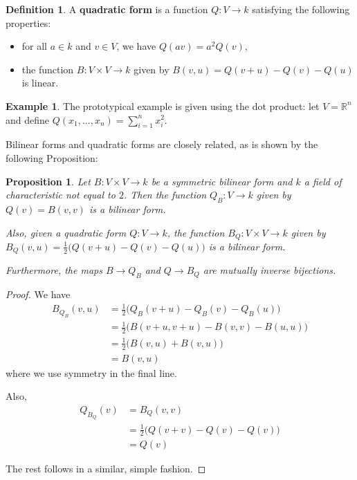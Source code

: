 \documentclass[12pt]{article}
\theoremstyle{plain}
\newtheorem{proposition}[thm]{Proposition}
\theoremstyle{definition}
\newtheorem{defn}[thm]{Definition} %
\newtheorem{example}[thm]{Example}
\newcommand{\bb}[1]{\mathbb{#1}}
\newcommand{\lto}{\longrightarrow}
\begin{document}
\begin{defn}
A \textbf{quadratic form} is a function $Q: V \lto k$ satisfying the following properties:
\begin{itemize}
    \item for all $a \in k$ and $v \in V$, we have $Q(av) = a^2Q(v)$,
    \item the function $B: V \times V \lto k$ given by $B(v,u) = Q(v + u) - Q(v) - Q(u)$ is linear.
\end{itemize}
\end{defn}
\begin{example}
The prototypical example is given using the dot product: let $V = \bb{R}^n$ and define $Q(x_1,...,x_n) = \sum_{i = 1}^n x_i^2$.
\end{example}
Bilinear forms and quadratic forms are closely related, as is shown by the following Proposition:
\begin{proposition}
Let $B: V \times V \lto k$ be a symmetric bilinear form and $k$ a field of characteristic not equal to $2$. Then the function $Q_B: V \lto k$ given by $Q(v) = B(v,v)$ is a bilinear form.

Also, given a quadratic form $Q: V \lto k$, the function $B_Q: V \times V \lto k$ given by $B_Q(v,u) = \frac{1}{2}\big(Q(v + u) - Q(v) - Q(u)\big)$ is a bilinear form.

Furthermore, the maps $B \lto Q_B$ and $Q \lto B_Q$ are mutually inverse bijections.
\end{proposition}
\begin{proof}
We have
\begin{align*}
    B_{Q_B}(v,u) &= \frac{1}{2}\big(Q_B(v + u) - Q_B(v) - Q_B(u)\big)\\
    &= \frac{1}{2}\big(B(v+u,v+u) - B(v,v) - B(u,u)\big)\\
    &= \frac{1}{2}\big(B(v,u) + B(v,u)\big)\\
    &= B(v,u)
\end{align*}
where we use symmetry in the final line.

Also,
\begin{align*}
    Q_{B_Q}(v) &= B_Q(v,v)\\
    &= \frac{1}{2}\big(Q(v + v) - Q(v) - Q(v)\big)\\
    &= Q(v)
\end{align*}

The rest follows in a similar, simple fashion.
\end{proof}
\end{document}

